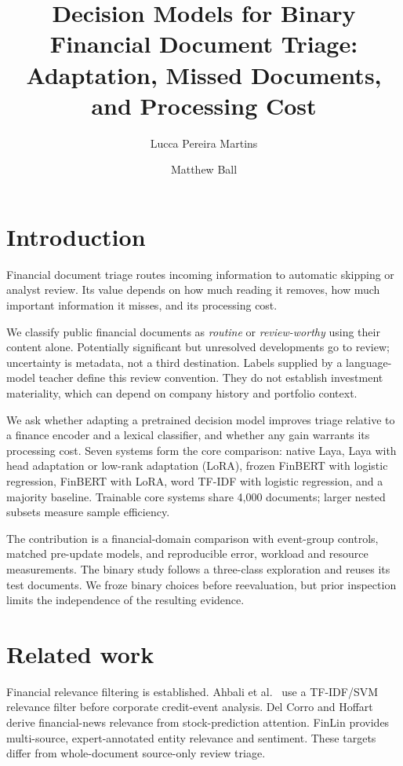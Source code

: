 \documentclass[11pt,a4paper]{article}
\title{Decision Models for Binary Financial Document Triage:\\
Adaptation, Missed Documents, and Processing Cost}
\author{Lucca Pereira Martins \and Matthew Ball}
\date{}
\begin{document}
\maketitle
\begin{abstract}

\end{abstract}

\section{Introduction}
Financial document triage routes incoming information to automatic skipping or
analyst review. Its value depends on how much reading it removes, how much
important information it misses, and its processing cost.

We classify public financial documents as \emph{routine} or \emph{review-worthy}
using their content alone. Potentially significant but unresolved developments
go to review; uncertainty is metadata, not a third destination. Labels supplied
by a language-model teacher define this review convention. They do not establish
investment materiality, which can depend on company history and portfolio context.

We ask whether adapting a pretrained decision model improves triage relative to
a finance encoder and a lexical classifier, and whether any gain warrants its
processing cost. Seven systems form the core comparison: native Laya, Laya with
head adaptation or low-rank adaptation (LoRA), frozen FinBERT with logistic
regression, FinBERT with LoRA, word TF-IDF with logistic regression, and a majority
baseline. Trainable core systems share 4,000 documents; larger nested subsets
measure sample efficiency.

The contribution is a financial-domain comparison with event-group controls,
matched pre-update models, and reproducible error, workload and resource
measurements. The binary study follows a three-class exploration and reuses its
test documents. We froze binary choices before reevaluation, but prior inspection
limits the independence of the resulting evidence.

\section{Related work}
Financial relevance filtering is established. Ahbali et al.\ \citep{credit}
use a TF-IDF/SVM relevance filter before corporate credit-event analysis.
Del Corro and Hoffart \citep{financialrelevance} derive financial-news relevance
from stock-prediction attention. FinLin \citep{finlin} provides multi-source,
expert-annotated entity relevance and sentiment. These targets differ from
whole-document source-only review triage.
\end{document}
